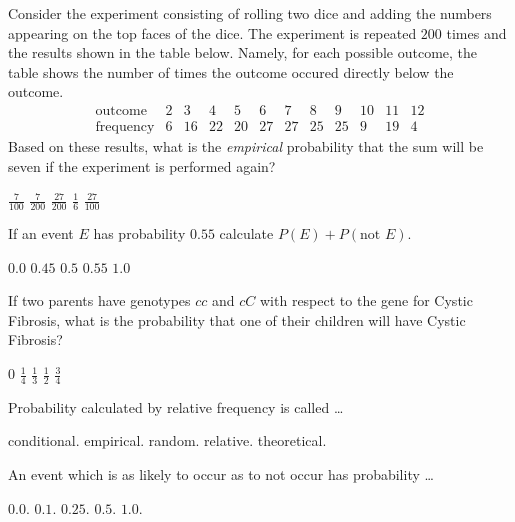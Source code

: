 \documentclass[12pt]{exam}
\begin{document}
\begin{questions}
\newpage
\question Consider the experiment consisting
of rolling two dice and adding the numbers
appearing on the top faces of the dice.
The experiment is repeated $200$ times and the
results shown in the table below. Namely, 
for each possible outcome, the table shows the number
of times the outcome occured directly below the outcome.
\[\begin{array}{r|ccccccccccc}
\text{outcome}&2&3&4&5&6&7&8&9&10&11&12\\\hline
\text{frequency}&6&16&22&20&27&27&25&25&9&19&4
\end{array}\]
Based on these results, what is the {\em empirical} probability
that the sum will be seven if the experiment is performed again?\\
\begin{oneparchoices}
\choice $\frac{7}{100}$
\choice $\frac{7}{200}$
\choice $\frac{27}{200}$
\choice $\frac{1}{6}$
\choice $\frac{27}{100}$
\end{oneparchoices}

\question If an event $E$ has probability $0.55$
calculate $P\left(E\right)+P\left(\text{not $E$}\right)$.\\
\begin{oneparchoices}
\choice $0.0$
\choice $0.45$
\choice $0.5$
\choice $0.55$
\choice $1.0$
\end{oneparchoices}

\question If two parents have genotypes $cc$ and $cC$
with respect to the gene for Cystic Fibrosis, what
is the probability that one of their children will have
Cystic Fibrosis?\\
\begin{oneparchoices}
\choice $0$
\choice $\frac{1}{4}$
\choice $\frac{1}{3}$
\choice $\frac{1}{2}$
\choice $\frac{3}{4}$
\end{oneparchoices}

\question Probability calculated by relative frequency is called \dots\\
\begin{oneparchoices}
\choice conditional.
\choice empirical.
\choice random.
\choice relative.
\choice theoretical.
\end{oneparchoices}

\question An event which is as likely to occur as to not occur has probability \dots\\
\begin{oneparchoices}
\choice $0.0$.
\choice $0.1$.
\choice $0.25$.
\choice $0.5$.
\choice $1.0$.
\end{oneparchoices}

\end{questions}
\end{document}
